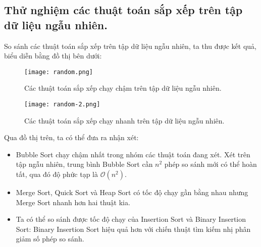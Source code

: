 \documentclass[]{article}
\begin{document}
\subsection{Thử nghiệm các thuật toán sắp xếp trên tập dữ liệu ngẫu nhiên.}
So sánh các thuật toán sắp xếp trên tập dữ liệu ngẫu nhiên, ta thu được kết quả, biểu diễn bằng đồ thị bên dưới:
\begin{figure}[H]
\centering
\texttt{[image: random.png]}
\caption{Các thuật toán sắp xếp chạy chậm trên tập dữ liệu ngẫu nhiên.}
\end{figure}
\begin{figure}[H]
\centering
\texttt{[image: random-2.png]}
\caption{Các thuật toán sắp xếp chạy nhanh trên tập dữ liệu ngẫu nhiên.}
\end{figure}
Qua đồ thị trên, ta có thể đưa ra nhận xét:
\begin{itemize}
\item Bubble Sort chạy chậm nhất trong nhóm các thuật toán đang xét. Xét trên tập ngẫu nhiên, trung bình Bubble Sort cần $n^2$ phép so sánh mới có thể hoàn tất, qua đó độ phức tạp là $\mathcal{O}(n^2)$.
\item Merge Sort, Quick Sort và Heap Sort có tốc độ chạy gần bằng nhau nhưng Merge Sort nhanh hơn hai thuật kia.
\item Ta có thể so sánh được tốc độ chạy của Insertion Sort và Binary Insertion Sort: Binary Insertion Sort hiệu quả hơn với chiến thuật tìm kiếm nhị phân giảm số phép so sánh.
\end{itemize}
\end{document}
